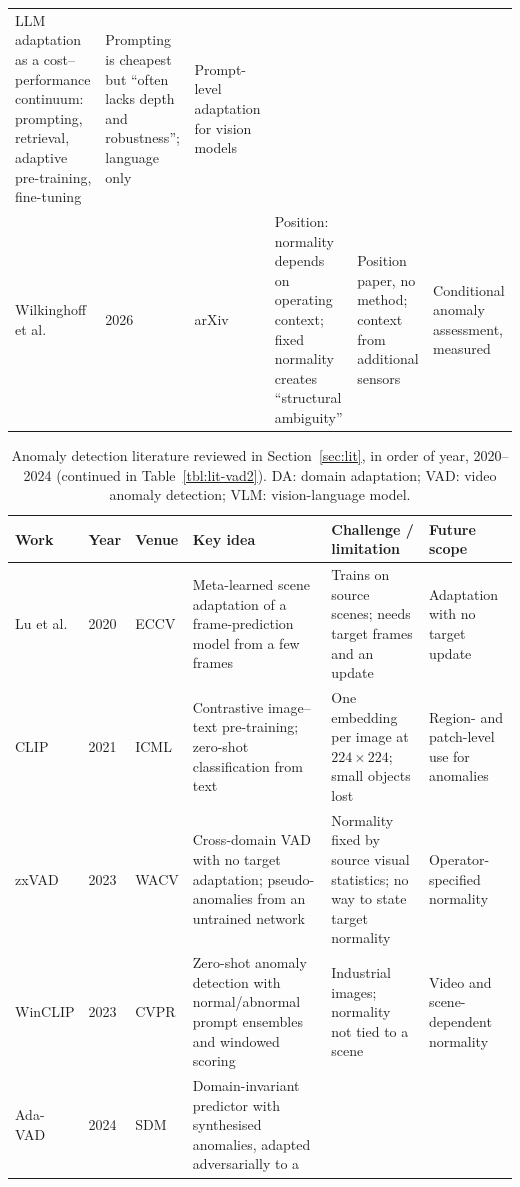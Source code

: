 \documentclass[a4paper,fleqn]{cas-sc}
\begin{document}
\begin{table}[width=\linewidth,cols=6,pos=htbp]
\begin{tabularx}{\linewidth}{@{}W{2.1cm} l W{1.7cm} Z Z Z@{}}
LLM adaptation as a cost--performance continuum: prompting, retrieval, adaptive
pre-training, fine-tuning &
Prompting is cheapest but ``often lacks depth and robustness''; language only &
Prompt-level adaptation for vision models \\
\addlinespace
Wilkinghoff et al. \citep{wilkinghoff2026context} & 2026 & arXiv &
Position: normality depends on operating context; fixed normality creates
``structural ambiguity'' &
Position paper, no method; context from additional sensors &
Conditional anomaly assessment, measured \\
\bottomrule
\end{tabularx}
\end{table}

\begin{table}[width=\linewidth,cols=6,pos=htbp]
\caption{Anomaly detection literature reviewed in Section~\ref{sec:lit}, in order
of year, 2020--2024 (continued in Table~\ref{tbl:lit-vad2}). DA: domain
adaptation; VAD: video anomaly detection; VLM: vision-language model.}
\label{tbl:lit-vad}
\footnotesize
\begin{tabularx}{\linewidth}{@{}W{2.1cm} l W{1.2cm} Z Z Z@{}}
\toprule
\textbf{Work} & \textbf{Year} & \textbf{Venue} & \textbf{Key idea} &
\textbf{Challenge / limitation} & \textbf{Future scope} \\
\midrule
Lu et al. \citep{lu2020fewshot} & 2020 & ECCV &
Meta-learned scene adaptation of a frame-prediction model from a few frames &
Trains on source scenes; needs target frames and an update &
Adaptation with no target update \\
\addlinespace
CLIP \citep{radford2021clip} & 2021 & ICML &
Contrastive image--text pre-training; zero-shot classification from text &
One embedding per image at $224\times224$; small objects lost &
Region- and patch-level use for anomalies \\
\addlinespace
zxVAD \citep{aich2023zxvad} & 2023 & WACV &
Cross-domain VAD with no target adaptation; pseudo-anomalies from an untrained
network &
Normality fixed by source visual statistics; no way to state target normality &
Operator-specified normality \\
\addlinespace
WinCLIP \citep{jeong2023winclip} & 2023 & CVPR &
Zero-shot anomaly detection with normal/abnormal prompt ensembles and windowed
scoring &
Industrial images; normality not tied to a scene &
Video and scene-dependent normality \\
\addlinespace
Ada-VAD \citep{adavad2024} & 2024 & SDM &
Domain-invariant predictor with synthesised anomalies, adapted adversarially to a

\end{tabularx}
\end{table}
\end{document}
